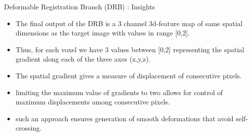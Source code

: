 \documentclass{beamer}
\begin{document}
\begin{frame}{Deformable Registration Branch (DRB) : Insights}
    \begin{itemize}
        \item The final output of the DRB is a 3 channel 3d-feature map of same spatial dimensions as the target image with values in range [0,2].
        \pause
        \item Thus, for each voxel we have 3 values between [0,2] representing the spatial gradient along each of the three axes (x,y,z).
        \pause
        \item The spatial gradient gives a measure of displacement of consecutive pixels.
        \pause
        \item limiting the maximum value of gradients to two allows for control of maximum displacements among consecutive pixels. 
        \pause
        \item such an approach ensures generation of smooth deformations that avoid self-crossing.
    \end{itemize}
\end{frame}
\end{document}
